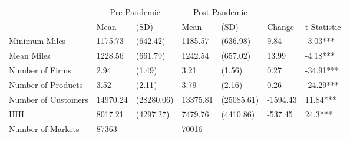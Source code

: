 
\begin{tabular}[t]{lllllll}
\toprule
\multicolumn{1}{c}{ } & \multicolumn{2}{c}{Pre-Pandemic} & \multicolumn{2}{c}{Post-Pandemic} & \multicolumn{2}{c}{ } \\
\cmidrule(l{3pt}r{3pt}){2-3} \cmidrule(l{3pt}r{3pt}){4-5}
 & Mean & (SD) & Mean & (SD) & Change & t-Statistic\\
\midrule
Minimum Miles & 1175.73 & (642.42) & 1185.57 & (636.98) & 9.84 & -3.03***\\
Mean Miles & 1228.56 & (661.79) & 1242.54 & (657.02) & 13.99 & -4.18***\\
Number of Firms & 2.94 & (1.49) & 3.21 & (1.56) & 0.27 & -34.91***\\
Number of Products & 3.52 & (2.11) & 3.79 & (2.16) & 0.26 & -24.29***\\
Number of Customers & 14970.24 & (28280.06) & 13375.81 & (25085.61) & -1594.43 & 11.84***\\
HHI & 8017.21 & (4297.27) & 7479.76 & (4410.86) & -537.45 & 24.3***\\
Number of Markets & 87363 &  & 70016 &  &  & \\
\bottomrule
\end{tabular}

